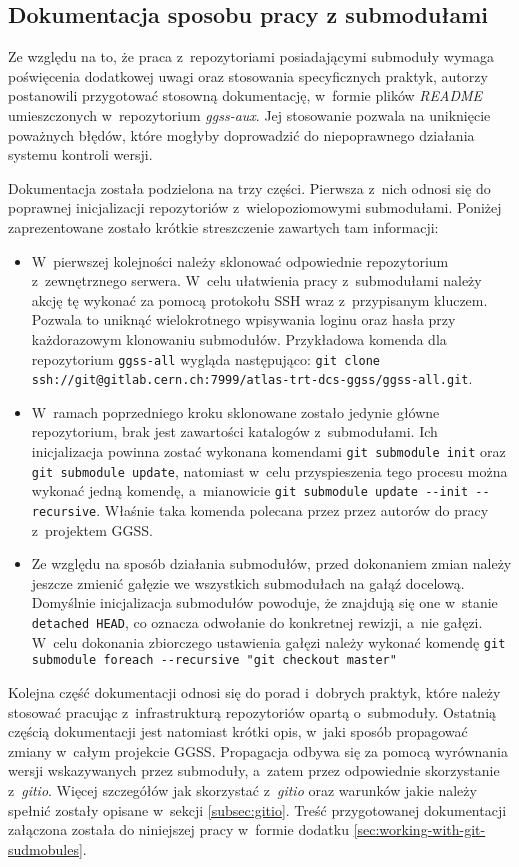 \subsection{Dokumentacja sposobu pracy z submodułami}
Ze względu na to, że praca z~repozytoriami posiadającymi submoduły wymaga poświęcenia dodatkowej uwagi oraz stosowania specyficznych praktyk, autorzy postanowili przygotować stosowną dokumentację, w~formie plików \emph{README} umieszczonych w~repozytorium \emph{ggss-aux}. Jej stosowanie pozwala na uniknięcie poważnych błędów, które mogłyby doprowadzić do niepoprawnego działania systemu kontroli wersji.

Dokumentacja została podzielona na trzy części. Pierwsza z~nich odnosi się do poprawnej inicjalizacji repozytoriów z~wielopoziomowymi submodułami. Poniżej zaprezentowane zostało krótkie streszczenie zawartych tam informacji:
\begin{itemize}
    \item W~pierwszej kolejności należy sklonować odpowiednie repozytorium z~zewnętrznego serwera. W~celu ułatwienia pracy z~submodułami należy akcję tę wykonać za pomocą protokołu SSH wraz z~przypisanym kluczem. Pozwala to uniknąć wielokrotnego wpisywania loginu oraz hasła przy każdorazowym klonowaniu submodułów. Przykładowa komenda dla repozytorium \lstinline{ggss-all} wygląda następująco: \lstinline{git clone ssh://git@gitlab.cern.ch:7999/atlas-trt-dcs-ggss/ggss-all.git}.
    \item W~ramach poprzedniego kroku sklonowane zostało jedynie główne repozytorium, brak jest zawartości katalogów z~submodułami. Ich inicjalizacja powinna zostać wykonana komendami \lstinline{git submodule init} oraz \lstinline{git submodule update}, natomiast w~celu przyspieszenia tego procesu można wykonać jedną komendę, a~mianowicie \lstinline{git submodule update --init --recursive}. Właśnie taka komenda polecana przez przez autorów do pracy z~projektem GGSS.
    \item Ze względu na sposób działania submodułów, przed dokonaniem zmian należy jeszcze zmienić gałęzie we wszystkich submodułach na gałąź docelową. Domyślnie inicjalizacja submodułów powoduje, że znajdują się one w~stanie \lstinline{detached HEAD}, co oznacza odwołanie do konkretnej rewizji, a~nie gałęzi. W~celu dokonania zbiorczego ustawienia gałęzi należy wykonać komendę \lstinline{git submodule foreach --recursive "git checkout master"}
\end{itemize}

Kolejna część dokumentacji odnosi się do porad i~dobrych praktyk, które należy stosować pracując z~infrastrukturą repozytoriów opartą o~submoduły. Ostatnią częścią dokumentacji jest natomiast krótki opis, w~jaki sposób propagować zmiany w~całym projekcie GGSS. Propagacja odbywa się za pomocą wyrównania wersji wskazywanych przez submoduły, a~zatem przez odpowiednie skorzystanie z~\emph{gitio}. Więcej szczegółów jak skorzystać z~\emph{gitio} oraz warunków jakie należy spełnić zostały opisane w~sekcji \ref{subsec:gitio}. Treść przygotowanej dokumentacji załączona została do niniejszej pracy w~formie dodatku \ref{sec:working-with-git-sudmobules}.
